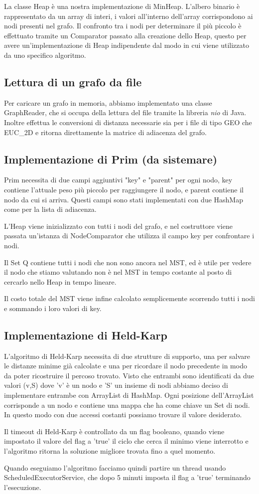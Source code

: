 La classe Heap è una nostra implementazione di MinHeap. L'albero binario è rappresentato da un array di interi, i valori all'interno dell'array corrispondono ai nodi presenti nel grafo. Il confronto tra i nodi per determinare il più piccolo è effettuato tramite un Comparator passato alla creazione dello Heap, questo per avere un'implementazione di Heap indipendente dal modo in cui viene utilizzato da uno specifico algoritmo.
\subsection{Lettura di un grafo da file}
Per caricare un grafo in memoria, abbiamo implementato una classe GraphReader, che si occupa della lettura del file tramite la libreria \textit{nio} di Java. Inoltre effettua le conversioni di distanza necessarie sia per i file di tipo GEO che EUC\_2D e ritorna direttamente la matrice di adiacenza del grafo.

\subsection{Implementazione di Prim (da sistemare)} 
Prim necessita di due campi aggiuntivi "key" e "parent" per ogni nodo, key contiene l'attuale peso più piccolo per raggiungere il nodo, e parent contiene il nodo da cui si arriva. Questi campi sono stati implementati con due HashMap come per la lista di adiacenza.

L'Heap viene inizializzato con tutti i nodi del grafo, e nel costruttore viene passata un'istanza di NodeComparator che utilizza il campo key per confrontare i nodi.

Il Set Q contiene tutti i nodi che non sono ancora nel MST, ed è utile per vedere il nodo che stiamo valutando non è nel MST in tempo costante al posto di cercarlo nello Heap in tempo lineare.

Il costo totale del MST viene infine calcolato semplicemente scorrendo tutti i nodi e sommando i loro valori di key.

\subsection{Implementazione di Held-Karp}

L'algoritmo di Held-Karp necessita di due strutture di supporto, una per salvare le distanze minime già calcolate e una per ricordare il nodo precedente in modo da poter ricostruire il percoso trovato. Visto che entrambi sono identificati da due valori (v,S) dove 'v' è un nodo e 'S' un insieme di nodi abbiamo deciso di implementare entrambe con ArrayList di HashMap. Ogni posizione dell'ArrayList corrisponde a un nodo e contiene una mappa che ha come chiave un Set di nodi. In questo modo con due accessi costanti possiamo trovare il valore desiderato.

Il timeout di Held-Karp è controllato da un flag booleano, quando viene impostato il valore del flag a 'true' il ciclo che cerca il minimo viene interrotto e l'algoritmo ritorna la soluzione migliore trovata fino a quel momento.

Quando eseguiamo l'algoritmo facciamo quindi partire un thread usando ScheduledExecutorService, che dopo 5 minuti imposta il flag a 'true' terminando l'esecuzione.

